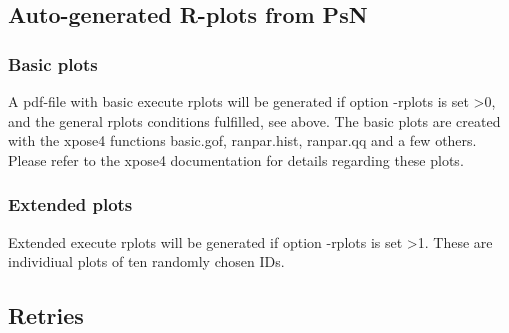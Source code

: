 \subsection{Auto-generated R-plots from PsN}
\newcommand{\rplotsconditions}{The default execute template 
requires the xpose4 R library. It also relies on Xpose-type tables being 
created, such as sdtab, patab and cotab, with the correct run number. 
See the Xpose documentation for requirements on such table files,
e.g. pages 106-108 in\\
\texttt{http://xpose.sourceforge.net/bestiarium\_v1.0.pdf}.\\
If option -subset\_variable\_rplots is used, 
the user must ensure that the subset variable
is printed to one of the xpose tables, for example sdtab, and then
there will be separate plots created for
subsets of the data, via xpose options 'subset' and 'by'. 
Xpose will treat the subset variable as continuous or categorical
based the number of unique values. The template contains 
a comment line with the xpose command for changing the default classification. 

If the conditions for creating the plots are not fulfilled then no pdf will be generated,
see the .Rout file in the main run directory for error messages.}


\subsubsection*{Basic plots}
A pdf-file with 
basic execute rplots will be generated if option -rplots is set >0,
and the general rplots conditions fulfilled, see above.
The basic plots are created with the xpose4 functions
basic.gof, ranpar.hist, ranpar.qq and a few others. Please
refer to the xpose4 documentation for details regarding these
plots.

\subsubsection*{Extended plots}
Extended execute rplots will be generated if option -rplots is set >1.
These are individiual plots of ten randomly chosen IDs.

\subsection{Retries}


